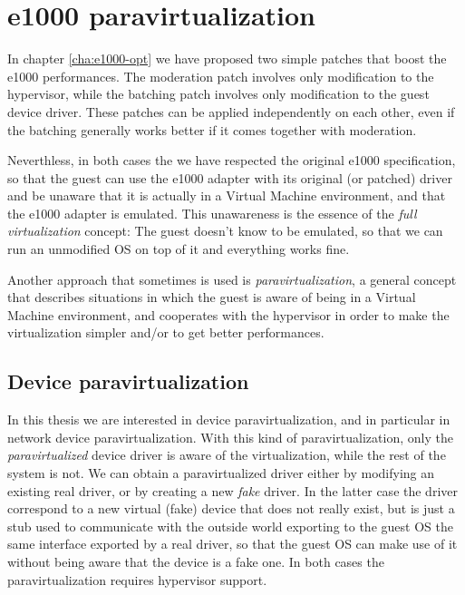 \chapter{e1000 paravirtualization}
\label{cha:paravirt}
In chapter \ref{cha:e1000-opt} we have proposed two simple patches that boost the e1000 performances.
The moderation patch involves only modification to the hypervisor, while the batching patch involves only modification to the
guest device driver. These patches can be applied independently on each other, even if the batching generally works better if
it comes together with moderation.

Neverthless, in both cases the we have respected the original e1000 specification, so that the guest can use the e1000 adapter with its
original (or patched) driver and be unaware that it is actually in a Virtual Machine environment, and that the e1000 adapter is
emulated. This unawareness is the essence of the \emph{full virtualization} concept: The guest doesn't know to be emulated, so
that we can run an unmodified OS on top of it and everything works fine.

\vspace{0.5cm}

Another approach that sometimes is used is \emph{paravirtualization}, a general concept that describes situations in which the 
guest is aware of being in a Virtual Machine environment, and cooperates with the hypervisor in order to make the virtualization simpler
and/or to get better performances.


\section{Device paravirtualization}
In this thesis we are interested in device paravirtualization, and in particular in network device paravirtualization.
With this kind of paravirtualization, only the \emph{paravirtualized} device driver is aware of the virtualization, while the rest of the
system is not.
We can obtain a paravirtualized driver either by modifying an existing real driver, or by creating a new \emph{fake} driver. In the
latter case the driver correspond to a new virtual (fake) device that does not really exist, but is just a stub used to communicate with 
the outside world exporting to the guest OS the same interface exported by a real driver, so that the guest OS
can make use of it without being aware that the device is a fake one.
In both cases the paravirtualization requires hypervisor support.

